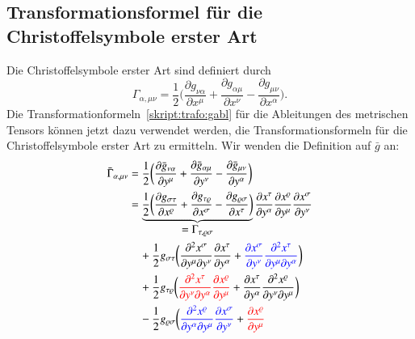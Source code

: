 \subsection{Transformationsformel für die Christoffelsymbole erster Art}
Die Christoffelsymbole erster Art sind definiert durch
\[
\Gamma_{\alpha,\mu\nu}
=
\frac12\biggl(
\frac{\partial g_{\nu\alpha}}{\partial x^\mu}
+
\frac{\partial g_{\alpha\mu}}{\partial x^\nu}
-
\frac{\partial g_{\mu\nu}}{\partial x^\alpha}
\biggr).
\]
Die Transformationformeln~\eqref{skript:trafo:gabl}
für die Ableitungen des metrischen Tensors können jetzt dazu verwendet
werden, die Transformationsformeln für die Christoffelsymbole erster Art
zu ermitteln.
Wir wenden die Definition auf $\bar g$ an:
\begin{align}
\bar\Gamma_{\alpha,\mu\nu}
&=
\frac12\biggl(
\frac{\partial \bar g_{\nu\alpha}}{\partial y^\mu}
+
\frac{\partial \bar g_{\alpha\mu}}{\partial y^\nu}
-
\frac{\partial \bar g_{\mu\nu}}{\partial y^\alpha}
\biggr)
\notag
\\
&=
\underbrace{
\frac12\biggl(
\frac{\partial g_{\sigma\tau}}{\partial x^\varrho}
+
\frac{\partial g_{\tau\varrho}}{\partial x^\sigma}
-
\frac{\partial g_{\varrho\sigma}}{\partial x^\tau}
\biggr)
}_{\displaystyle = \Gamma_{\tau,\varrho\sigma}}
\frac{\partial x^\tau}{\partial y^\alpha}
\frac{\partial x^\varrho}{\partial y^\mu}
\frac{\partial x^\sigma}{\partial y^\nu}
\notag
\\
&\quad
+\frac12g_{\sigma\tau}
\biggl(
\frac{\partial^2 x^\sigma}{\partial y^\mu\partial y^\nu}
\frac{\partial x^\tau}{\partial y^\alpha}
+
{\color{blue}
\frac{\partial x^\sigma}{\partial y^\nu}
\frac{\partial^2 x^\tau}{\partial y^\mu\partial y^\alpha}}
\biggr)
\notag
\\
&\quad
+\frac12g_{\tau\varrho}
\biggl(
{\color{red}
\frac{\partial^2 x^\tau}{\partial y^\nu\partial y^\alpha}
\frac{\partial x^\varrho}{\partial y^\mu}}
+
\frac{\partial x^\tau}{\partial y^\alpha}
\frac{\partial^2 x^\varrho}{\partial y^\nu\partial y^\mu}
\biggr)
\notag
\\
&\quad
-\frac12g_{\varrho\sigma}
\biggl(
{\color{blue}
\frac{\partial^2 x^\varrho}{\partial y^\alpha\partial y^\mu}
\frac{\partial x^\sigma}{\partial y^\nu}}
+
{\color{red}
\frac{\partial x^\varrho}{\partial y^\mu}
}
\end{align}
